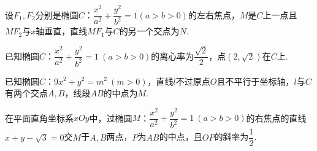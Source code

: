 \documentclass{BHCexam}
\begin{document}
\begin{questions}
\newpage
\question
设$F_1,F_2$分别是椭圆$C$：$\dfrac{x^2}{a^2}+\dfrac{y^2}{b^2}=1(a>b>0)$的左右焦点，$M$是$C$上一点且$MF_2$与$x$轴垂直，直线$MF_1$与$C$的另一个交点为$N$.
\kongbai
\qs
已知椭圆$C$：$\dfrac{x^2}{a^2}+\dfrac{y^2}{b^2}=1~(a>b>0)$的离心率为$\dfrac{\sqrt{2}}{2}$，点$(2,\sqrt{2})$在$C$上.
\newpage
\qs 
已知椭圆$C$：$9x^2+y^2=m^2~(m>0)$，直线$l$不过原点$O$且不平行于坐标轴，$l$与$C$有两个交点$A,B$，线段$AB$的中点为$M$.
\kongbai
\qs 
在平面直角坐标系$xOy$中，过椭圆$M$：$\dfrac{x^2}{a^2}+\dfrac{y^2}{b^2}=1~(a>b>0)$的右焦点的直线$x+y-\sqrt{3}=0$交$M$于$A,B$两点，$P$为$AB$的中点，且$OP$的斜率为$\dfrac{1}{2}$.
\begin{parts}

\end{parts}
\end{questions}
\end{document}
